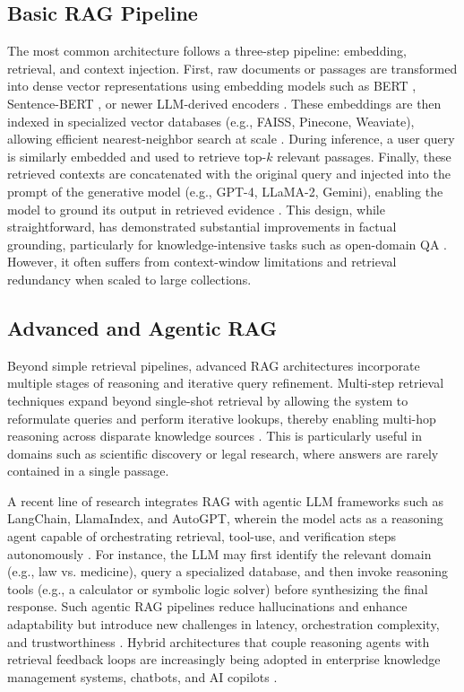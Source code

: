 \documentclass[conference]{IEEEtran}
\begin{document}
\subsection{Basic RAG Pipeline}

The most common architecture follows a three-step pipeline: embedding, retrieval, and context injection. First, raw documents or passages are transformed into dense vector representations using embedding models such as BERT \cite{devlin2019bert}, Sentence-BERT \cite{reimers2019sentencebert}, or newer LLM-derived encoders \cite{neelakantan2022text}. These embeddings are then indexed in specialized vector databases (e.g., FAISS, Pinecone, Weaviate), allowing efficient nearest-neighbor search at scale \cite{johnson2019faiss,pinecone, weaviate}. During inference, a user query is similarly embedded and used to retrieve top-$k$ relevant passages. Finally, these retrieved contexts are concatenated with the original query and injected into the prompt of the generative model (e.g., GPT-4, LLaMA-2, Gemini), enabling the model to ground its output in retrieved evidence \cite{brown2020gpt3,touvron2023llama,anil2023gemini}. This design, while straightforward, has demonstrated substantial improvements in factual grounding, particularly for knowledge-intensive tasks such as open-domain QA \cite{izacard2021leveraging,asai2020learning}. However, it often suffers from context-window limitations and retrieval redundancy when scaled to large collections.

\subsection{Advanced and Agentic RAG}

Beyond simple retrieval pipelines, advanced RAG architectures incorporate multiple stages of reasoning and iterative query refinement. Multi-step retrieval techniques expand beyond single-shot retrieval by allowing the system to reformulate queries and perform iterative lookups, thereby enabling multi-hop reasoning across disparate knowledge sources \cite{asai2020learning,trivedi2022multi}. This is particularly useful in domains such as scientific discovery or legal research, where answers are rarely contained in a single passage. 

A recent line of research integrates RAG with agentic LLM frameworks such as LangChain, LlamaIndex, and AutoGPT, wherein the model acts as a reasoning agent capable of orchestrating retrieval, tool-use, and verification steps autonomously \cite{yao2024ragreview,schick2023toolformer}. For instance, the LLM may first identify the relevant domain (e.g., law vs. medicine), query a specialized database, and then invoke reasoning tools (e.g., a calculator or symbolic logic solver) before synthesizing the final response. Such agentic RAG pipelines reduce hallucinations and enhance adaptability but introduce new challenges in latency, orchestration complexity, and trustworthiness \cite{shen2023hugginggpt,park2023generative,thoppilan2022lamda}. Hybrid architectures that couple reasoning agents with retrieval feedback loops are increasingly being adopted in enterprise knowledge management systems, chatbots, and AI copilots \cite{bommasani2022opportunities}.
\end{document}

